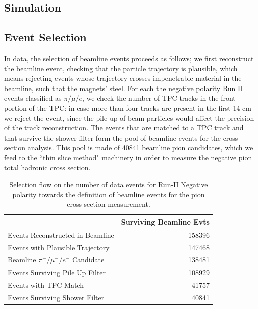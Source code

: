 \documentclass[aps,prl,twocolumn,showpacs,superscriptaddress,groupedaddress]{revtex4}  %
\begin{document}
\subsection{\label{sec:Simulation}Simulation}
\subsection{\label{sec:EventSelection}Event Selection}
In data, the selection of beamline events proceeds as follows; we first reconstruct the beamline event, checking that the particle trajectory is plausible, which means rejecting events whose trajectory crosses impenetrable material in the beamline, such that the magnets' steel.  For each the negative polarity Run II events classified as $\pi/\mu/e$, we check the number of TPC tracks in the front portion of the TPC: in case more than four tracks are present in the first 14 cm we reject the event,  since the pile up of beam particles would affect the precision of the track reconstruction.
The events that are matched to a TPC track and that survive the shower filter form the pool of beamline events for the cross section analysis. This pool is made of 40841 beamline pion candidates, which we feed to the ``thin slice method" machinery in order to measure the negative pion total hadronic cross section. 


\begin{table}
\caption{\label{tab:beamlineDataSelection}Selection flow on the number of data events for Run-II Negative polarity towards the definition of beamline events for the pion cross section measurement.}
\begin{ruledtabular}
\begin{tabular}{l|r}
                                                        & Surviving Beamline Evts     \\ \hline
Events Reconstructed in Beamline        &  158396     \\ \hline
Events with Plausible Trajectory            &   147468    \\ \hline
Beamline $\pi^-/\mu^-/e^-$  Candidate  &   138481    \\ \hline
Events Surviving Pile Up Filter              &   108929    \\ \hline
Events with TPC Match                         &    41757     \\ \hline
Events Surviving Shower Filter             &    40841     \\ 
\end{tabular}
\end{ruledtabular}
\end{table}
\end{document}
